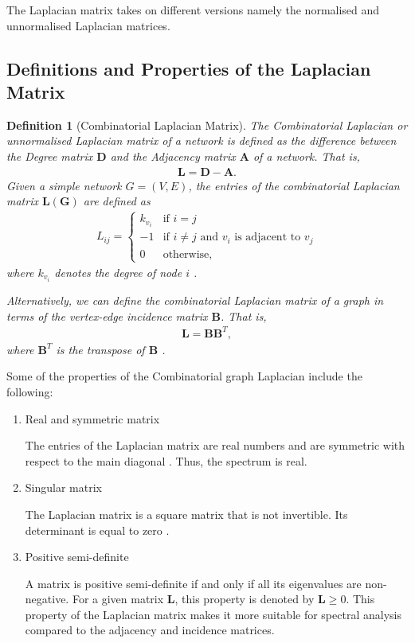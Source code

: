 \documentclass[10pt,a4paper]{article}
\newtheorem{defn}{Definition}
\begin{document}
The Laplacian matrix takes on different versions namely the normalised and unnormalised Laplacian matrices.

\subsection{Definitions and Properties of the Laplacian Matrix}

\begin{defn}[Combinatorial Laplacian Matrix]
	The Combinatorial Laplacian or unnormalised Laplacian matrix of a network is defined as the difference between the Degree matrix $\mathbf{D}$ and the Adjacency matrix $\mathbf{A}$ of a network. That is,
	\begin{eqnarray}
	\mathbf{L} = \mathbf{D} - \mathbf{A}.
	\end{eqnarray}
	Given a simple network $G=(V,E)$, the entries of the combinatorial Laplacian matrix $\mathbf{L(G)}$  are defined as
	\begin{eqnarray}
	L_{ij} = \begin{cases} k_{v_i} &\mbox{if } i = j \\
	-1 &\mbox{if } i \neq j \text{ and } v_i \text{ is adjacent to } v_j \\
	0 & \text{otherwise},
	\end{cases}
	\end{eqnarray}
	where $k_{v_i}$  denotes the degree of node $i$ \citep{estrada2011structure}.
	
	Alternatively, we can define the combinatorial Laplacian matrix of a graph in terms of the vertex-edge incidence matrix $\mathbf{B}$. That is,
	\begin{eqnarray}
	\mathbf{L} =  \mathbf{B} \mathbf{B}^T,
	\label{lintermsb}
	\end{eqnarray}
	where $\mathbf{B}^T$ is the transpose of $\mathbf{B}$ \citep{estrada2011structure}.
\end{defn}

Some of the properties of the Combinatorial graph Laplacian  include the following:
\begin{enumerate}	
	\item{Real and symmetric matrix} 
	
	The entries of the Laplacian matrix are real numbers and are symmetric with respect to the main diagonal \citep{das2004laplacian}. Thus, the spectrum is real.
	\item{Singular matrix}
	
	The Laplacian matrix is a square matrix that is not invertible. Its determinant is equal to zero \citep{das2004laplacian}.
	\item{Positive semi-definite}
	
	A matrix is positive semi-definite if and only if all its eigenvalues are non-negative. For a given matrix $\mathbf{L}$, this property is denoted by $\mathbf{L}\geq 0$. This property of the Laplacian matrix makes it more suitable for spectral analysis compared to the adjacency and incidence matrices.
	
\end{enumerate}
\end{document}

